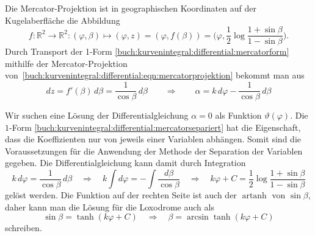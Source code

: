 Die Mercator-Projektion ist in geographischen Koordinaten
auf der Kugelaberfläche die Abbildung
\[
f\colon
\mathbb{R}^2\to\mathbb{R}^2
:
(\varphi,\beta)
\mapsto
(\varphi,z)
=
(\varphi,f(\beta))
=
\biggl(\varphi,\frac12\log\frac{1+\sin\beta}{1-\sin\beta}\biggr).
\]
Durch Transport der 1-Form
\eqref{buch:kurvenintegral:differential:mercatorform}
mithilfe der Mercator-Projektion
von~\eqref{buch:kurvenintegral:differential:eqn:mercatorprojektion}
bekommt man aus
\begin{equation}
dz
=
f'(\beta)\,d\beta
=
\frac{1}{\cos\beta}\,d\beta
\qquad\Rightarrow\qquad
\alpha
=
k\,d\varphi-\frac{1}{\cos\beta}\,d\beta
\label{buch:kurvenintegral:differential:mercatorsepariert}
\end{equation}

Wir suchen eine Lösung der Differentialgleichung $\alpha=0$
als Funktion $\vartheta(\varphi)$.
Die $1$-Form
\eqref{buch:kurvenintegral:differential:mercatorsepariert}
hat die Eigenschaft, dass die Koeffizienten nur von jeweils
einer Variablen abhängen.
Somit sind die Voraussetzungen für die Anwendung der Methode
der Separation der Variablen gegeben.
Die Differentialgleichung kann damit durch Integration
\[
k\,d\varphi=\frac{1}{\cos\beta}\,d\beta
\quad
\Rightarrow
\quad
k\int d\varphi
=-
\int \frac{d\beta}{\cos\beta}
\quad
\Rightarrow
\quad
k\varphi + C
=
\frac12
\log\frac{1+\sin\beta}{1-\sin\beta}
\]
gelöst werden.
Die Funktion auf der rechten Seite ist auch der $\operatorname{artanh}$
von $\sin\beta$, daher kann man die Lösung für die Loxodrome auch
als
\[
\sin\beta
=
\tanh(k\varphi+C)
\quad
\Rightarrow
\quad
\beta = \arcsin\tanh(k\varphi+C)
\]
schreiben.

